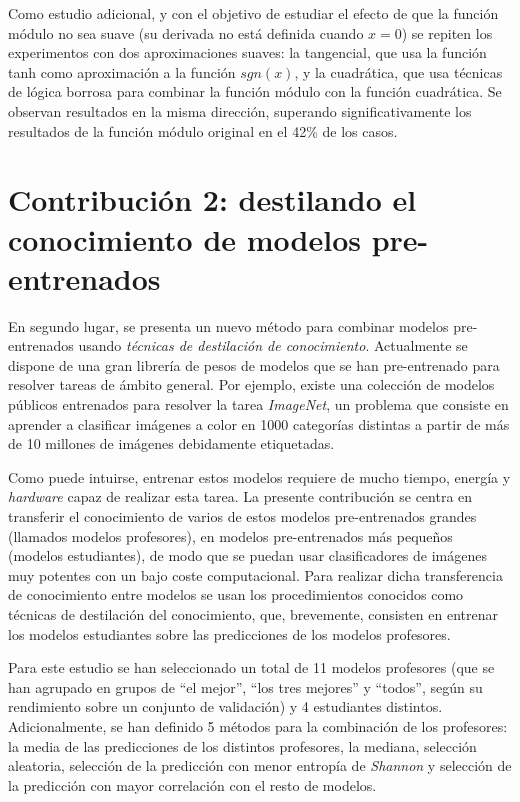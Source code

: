 Como estudio adicional, y con el objetivo de estudiar el efecto de que la función módulo no sea suave (su derivada no está definida cuando $x=0$) se repiten los experimentos con dos aproximaciones suaves: la tangencial, que usa la función tanh como aproximación a la función $sgn(x)$, y la cuadrática, que usa técnicas de lógica borrosa para combinar la función módulo con la función cuadrática. Se observan resultados en la misma dirección, superando significativamente los resultados de la función módulo original en el 42\% de los casos.

\section*{Contribución 2: destilando el conocimiento de modelos pre-entrenados}
En segundo lugar, se presenta un nuevo método para combinar modelos pre-entrenados usando \textit{técnicas de destilación de conocimiento}. Actualmente se dispone de una gran librería de pesos de modelos que se han pre-entrenado para resolver tareas de ámbito general. Por ejemplo, existe una colección de modelos públicos entrenados para resolver la tarea \textit{ImageNet}, un problema que consiste en aprender a clasificar imágenes a color en 1000 categorías distintas a partir de más de 10 millones de imágenes debidamente etiquetadas. 

Como puede intuirse, entrenar estos modelos requiere de mucho tiempo, energía y \textit{hardware} capaz de realizar esta tarea. La presente contribución se centra en transferir el conocimiento de varios de estos modelos pre-entrenados grandes (llamados modelos profesores), en modelos pre-entrenados más pequeños (modelos estudiantes), de modo que se puedan usar clasificadores de imágenes muy potentes con un bajo coste computacional. Para realizar dicha transferencia de conocimiento entre modelos se usan los procedimientos conocidos como técnicas de destilación del conocimiento, que, brevemente, consisten en entrenar los modelos estudiantes sobre las predicciones de los modelos profesores.

Para este estudio se han seleccionado un total de 11 modelos profesores (que se han agrupado en grupos de ``el mejor'', ``los tres mejores'' y ``todos'', según su rendimiento sobre un conjunto de validación) y 4 estudiantes distintos. Adicionalmente, se han definido 5 métodos para la combinación de los profesores: la media de las predicciones de los distintos profesores, la mediana, selección aleatoria, selección de la predicción con menor entropía de \textit{Shannon} y selección de la predicción con mayor correlación con el resto de modelos. 

